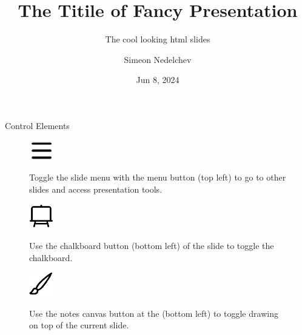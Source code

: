 \documentclass[
  ignorenonframetext,
  aspectratio=169,
]{beamer}
\title{The Titile of Fancy Presentation}
\subtitle{The cool looking html slides}
\author{Simeon Nedelchev}
\date{Jun 8, 2024}
\theoremstyle{plain}
\theoremstyle{remark}
\begin{document}
\frame{\titlepage}

\begin{frame}{Control Elements}
\label{control-elements}
\begin{figure}

\begin{minipage}{0.05\linewidth}
\includegraphics[width=0.42708in,height=\textheight]{images/icons/menu.png}\end{minipage}%
%
\begin{minipage}{0.95\linewidth}
Toggle the slide menu with the menu button (top left) to go to other
slides and access presentation tools.\end{minipage}%

\end{figure}%

\begin{figure}

\begin{minipage}{0.05\linewidth}
\includegraphics[width=0.42708in,height=\textheight]{images/icons/chalkboard.png}\end{minipage}%
%
\begin{minipage}{0.95\linewidth}
Use the chalkboard button (bottom left) of the slide to toggle the
chalkboard.\end{minipage}%

\end{figure}%

\begin{figure}

\begin{minipage}{0.05\linewidth}
\includegraphics[width=0.42708in,height=\textheight]{images/icons/canvas.png}\end{minipage}%
%
\begin{minipage}{0.95\linewidth}
Use the notes canvas button at the (bottom left) to toggle drawing on
top of the current slide.\end{minipage}%

\end{figure}%
\end{frame}
\end{document}
